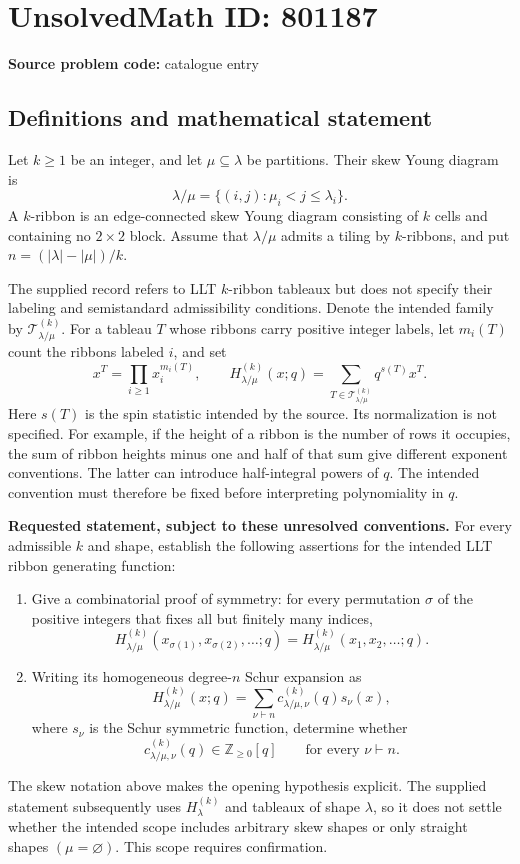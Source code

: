 \documentclass[11pt]{article}
\begin{document}
\section*{UnsolvedMath ID: 801187}
\textbf{Source problem code:} catalogue entry
\subsection{Definitions and mathematical statement}
Let \(k\geq 1\) be an integer, and let \(\mu\subseteq\lambda\) be partitions. Their skew Young diagram is
\[
\lambda/\mu=\{(i,j):\mu_i<j\leq\lambda_i\}.
\]
A \(k\)-ribbon is an edge-connected skew Young diagram consisting of \(k\) cells and containing no \(2\times2\) block. Assume that \(\lambda/\mu\) admits a tiling by \(k\)-ribbons, and put \(n=(|\lambda|-|\mu|)/k\).

The supplied record refers to LLT \(k\)-ribbon tableaux but does not specify their labeling and semistandard admissibility conditions. Denote the intended family by \(\mathcal T^{(k)}_{\lambda/\mu}\). For a tableau \(T\) whose ribbons carry positive integer labels, let \(m_i(T)\) count the ribbons labeled \(i\), and set
\[
x^T=\prod_{i\geq1}x_i^{m_i(T)},
\qquad
H^{(k)}_{\lambda/\mu}(x;q)
=\sum_{T\in\mathcal T^{(k)}_{\lambda/\mu}}q^{s(T)}x^T.
\]
Here \(s(T)\) is the spin statistic intended by the source. Its normalization is not specified. For example, if the height of a ribbon is the number of rows it occupies, the sum of ribbon heights minus one and half of that sum give different exponent conventions. The latter can introduce half-integral powers of \(q\). The intended convention must therefore be fixed before interpreting polynomiality in \(q\).

\textbf{Requested statement, subject to these unresolved conventions.}
For every admissible \(k\) and shape, establish the following assertions for the intended LLT ribbon generating function:
\begin{enumerate}
\item[(a)] Give a combinatorial proof of symmetry: for every permutation \(\sigma\) of the positive integers that fixes all but finitely many indices,
\[
H^{(k)}_{\lambda/\mu}(x_{\sigma(1)},x_{\sigma(2)},\ldots;q)
=H^{(k)}_{\lambda/\mu}(x_1,x_2,\ldots;q).
\]
\item[(b)] Writing its homogeneous degree-\(n\) Schur expansion as
\[
H^{(k)}_{\lambda/\mu}(x;q)
=\sum_{\nu\vdash n}c^{(k)}_{\lambda/\mu,\nu}(q)s_\nu(x),
\]
where \(s_\nu\) is the Schur symmetric function, determine whether
\[
c^{(k)}_{\lambda/\mu,\nu}(q)\in\mathbb Z_{\geq0}[q]
\qquad\text{for every }\nu\vdash n.
\]
\end{enumerate}
The skew notation above makes the opening hypothesis explicit. The supplied statement subsequently uses \(H^{(k)}_\lambda\) and tableaux of shape \(\lambda\), so it does not settle whether the intended scope includes arbitrary skew shapes or only straight shapes \((\mu=\varnothing)\). This scope requires confirmation.
\end{document}
